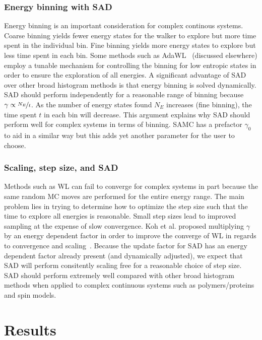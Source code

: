 \documentclass[letterpaper,twocolumn,amsmath,amssymb,pre,aps,10pt]{revtex4-1}
\begin{document}
\subsubsection{Energy binning with SAD}

Energy binning is an important consideration for complex continous
systems. Coarse binning yields fewer energy states for the walker to
explore but more time spent in the individual bin. Fine binning yields
more energy states to explore but less time spent in each bin.  Some
methods such as AdaWL~\cite{koh2013dynamically} (discussed elsewhere)
employ a tunable mechanism for controlling the binning for low entropic
states in order to ensure the exploration of all energies. A
significant advantage of SAD over other broad histogram methods is that
energy binning is solved dynamically. SAD should perform independently
for a reasonable range of binning because $\gamma \propto
\nicefrac{N_{E}}{t}$.  As the number of energy states found $N_{E}$
increases (fine binning), the time spent $t$ in each bin will decrease.
This argument explains why SAD should perform well for complex systems
in terms of binning. SAMC has a prefactor $\gamma_0$ to aid in a
similar way but this adds yet another parameter for the user to choose.

\subsubsection{Scaling, step size, and SAD}
Methods such as WL can fail to converge for complex systems in part
because the same random MC moves are performed for the entire energy
range.  The main problem lies in trying to determine how to optimize
the step size such that the time to explore all energies is reasonable.
Small step sizes lead to improved sampling at the expense of slow
convergence. Koh et al. proposed multiplying $\gamma$ by an energy
dependent factor in order to improve the converge of WL in regards to
convergence and scaling~\cite{koh2013dynamically}.  Because the update
factor for SAD has an energy dependent factor already present (and
dynamically adjusted), we expect that SAD will perform consitently
scaling free for a reasonable choice of step size.  SAD should perform
extremely well compared with other broad histogram methods when applied
to complex continuous systems such as polymers/proteins and spin models.

\section{Results}\label{sec:results}
\end{document}
